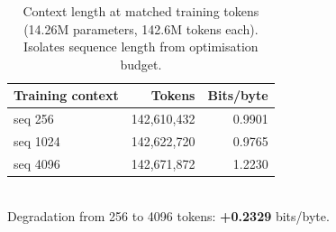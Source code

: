 \begin{table}[htbp]
\centering
\caption{Context length at matched training tokens (14.26M parameters,
142.6M tokens each). Isolates sequence length from optimisation budget.}
\label{tab:context}
\begin{tabular}{lrr}
\toprule
Training context & Tokens & Bits/byte \\
\midrule
seq 256 & 142{,}610{,}432 & 0.9901 \\
seq 1024 & 142{,}622{,}720 & 0.9765 \\
seq 4096 & 142{,}671{,}872 & 1.2230 \\
\bottomrule
\end{tabular}
\\[0.5em]
Degradation from 256 to 4096 tokens: \textbf{+0.2329} bits/byte.
\end{table}
